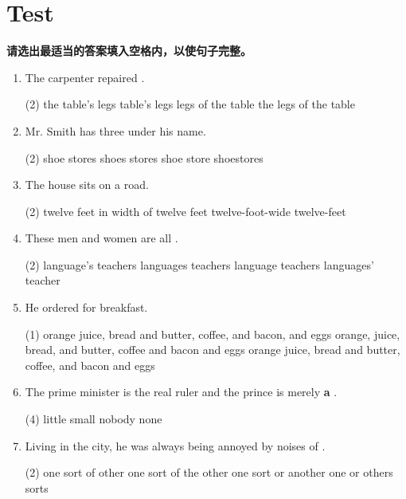 \section{Test}


\textbf{请选出最适当的答案填入空格内，以使句子完整。}

\begin{enumerate}
\item The carpenter repaired \ttu.
  \begin{tasks}(2)
    \task the table's legs
    \task table's legs
    \task legs of the table
    \task the legs of the table
  \end{tasks}

\item Mr. Smith has three \ttu under his name.
  \begin{tasks}(2)
    \task shoe stores \task shoes stores \task shoe store \task shoestores
  \end{tasks}

\item The house sits on a \ttu road.
  \begin{tasks}(2)
    \task twelve feet in width
    \task of twelve feet
    \task twelve-foot-wide
    \task twelve-feet
  \end{tasks}

\item These men and women are all \ttu .
  \begin{tasks}(2)
    \task language's teachers \task languages teachers
    \task language teachers \task languages' teacher
  \end{tasks}

\item He ordered  \ttu for breakfast.
  \begin{tasks}(1)
    \task orange juice, bread and butter, coffee, and bacon, and eggs
    \task orange, juice, bread, and butter, coffee and bacon and eggs
    \task orange juice, bread and butter, coffee, and bacon and eggs
  \end{tasks}

\item The prime minister is the real ruler and the prince is merely \textbf{a} \ttu .
  \begin{tasks}(4)
    \task little
    \task small
    \task nobody
    \task none
  \end{tasks}

\item Living in the city, he was always being annoyed by noises of  \ttu .
  \begin{tasks}(2)
    \task one sort of other
    \task one sort of the other
    \task one sort or another
    \task one or others sorts
  \end{tasks}


\end{enumerate}
